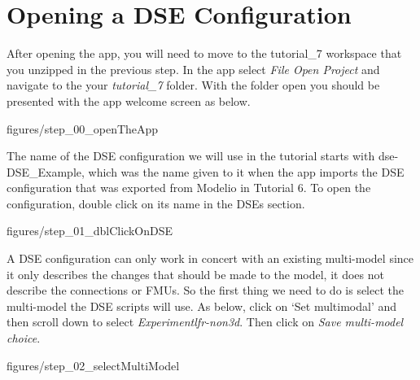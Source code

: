 \documentclass[11pt,a4paper]{../tutorial}
\begin{document}
\section{Opening a DSE Configuration}

After opening the app, you will need to move to the tutorial\_7 workspace that you unzipped in the previous step.  In the app select \emph{File \menusep Open Project} and navigate to the your \emph{tutorial\_7} folder.  With the folder open you should be presented with the app welcome screen as below.

\begin{center}\begin{annotation}[width=0.7\linewidth,trim=0 0 0 0,clip]{figures/step_00_openTheApp}
\end{annotation}\end{center}

The name of the DSE configuration we will use in the tutorial starts with dse-DSE\_Example, which was the name given to it when the app imports the DSE configuration that was exported from Modelio in Tutorial 6.  
To open the configuration, double click on its name in the DSEs section.


\begin{center}\begin{annotation}[width=0.7\linewidth,trim=0 0 0 0,clip]{figures/step_01_dblClickOnDSE}
\end{annotation}\end{center}

A DSE configuration can only work in concert with an existing multi-model since it only describes the changes that should be made to the model, it does not describe the connections or FMUs.  So the first thing we need to do is select the multi-model the DSE scripts will use.  As below, click on ‘Set multimodal’ and then scroll down to select \emph{Experiment\pathsep{}lfr-non3d}.  Then click on \emph{Save multi-model choice}.


\begin{center}\begin{annotation}[width=0.7\linewidth,trim=0 0 0 0,clip]{figures/step_02_selectMultiModel}
\end{annotation}\end{center}
\end{document}
